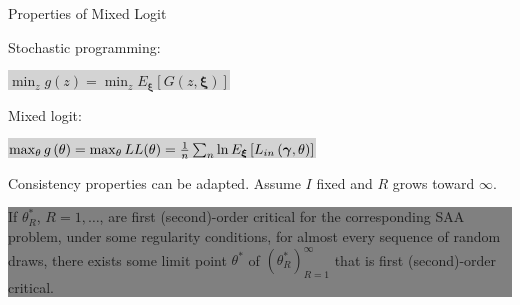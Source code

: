 \documentclass[aspectratio=169]{beamer}
\def\bxi{\boldsymbol\xi}
\begin{document}
\begin{frame}{Properties of Mixed Logit}
		
		\begin{footnotesize}
			{\blue Stochastic programming}:
			\begin{center}
				\colorbox{lightgray}{
					$\min_z g(z) = \min_z E_{\bxi} \left[G(z,\boldsymbol{\xi})\right]$
				}
			\end{center}
			
			{\blue Mixed logit}:
			\begin{center}
				\colorbox{lightgray}{
					$\max_{\theta} g\left(\theta\right) = \max_{\theta} LL(\theta) \notag
					= \frac{1}{n} \sum_n \ln E_{\bxi} \left[ L_{in} \left(
					\boldsymbol{\gamma}, \theta \right) \right]$
				}
			\end{center}
			
			\vspace*{0.5cm}
				Consistency properties can be adapted. Assume {\red $I$ fixed} and {\red
					$R$ grows toward $\infty$}.
				
				\begin{center}
					\colorbox{gray}{
						\begin{minipage}[fillstyle=solid, fillcolor=orange]{0.9\textwidth}
							If $\theta^*_R$, $R=1,\ldots$, are first (second)-order critical for
							the corresponding SAA problem, under some regularity conditions, for
							almost every sequence of random draws, there exists some limit point
							$\theta^*$ of $\left( \theta_R^* \right)_{R=1}^{\infty}$ that is first
							(second)-order critical.
						\end{minipage}
					}
				\end{center}
			
		\end{footnotesize}
		
\end{frame}

\end{document}

